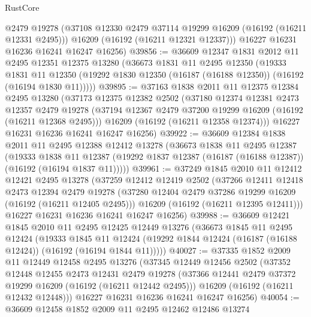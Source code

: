 \begin{lexlean}{RustCore}
\begin{coremodule}
        @2479
        @19278
        (@37108 @12330 @2479 @37114 @19299 @16209 (@16192 (@16211 @12331 @2495)))
        @16209
        (@16192 (@16211 @12321 @12337)))
      @16227
      @16231
      @16236
      @16241
      @16247
      @16256)
@39856 := @36609
    @12347
    @1831
    @2012
    @11
    @2495
    @12351
    @12375
    @13280
    (@36673
      @1831
      @11
      @2495
      @12350
      (@19333
        @1831
        @11
        @12350
        (@19292 @1830 @12350 (@16187 (@16188 @12350)) (@16192 (@16194 @1830 @11)))))
@39895 := @37163
    @1838
    @2011
    @11
    @12375
    @12384
    @2495
    @13280
    (@37173
      @12375
      @12382
      @2502
      (@37180
        @12374
        @12381
        @2473
        @12357
        @2479
        @19278
        (@37194 @12367 @2479 @37200 @19299 @16209 (@16192 (@16211 @12368 @2495)))
        @16209
        (@16192 (@16211 @12358 @12374)))
      @16227
      @16231
      @16236
      @16241
      @16247
      @16256)
@39922 := @36609
    @12384
    @1838
    @2011
    @11
    @2495
    @12388
    @12412
    @13278
    (@36673
      @1838
      @11
      @2495
      @12387
      (@19333
        @1838
        @11
        @12387
        (@19292 @1837 @12387 (@16187 (@16188 @12387)) (@16192 (@16194 @1837 @11)))))
@39961 := @37249
    @1845
    @2010
    @11
    @12412
    @12421
    @2495
    @13278
    (@37259
      @12412
      @12419
      @2502
      (@37266
        @12411
        @12418
        @2473
        @12394
        @2479
        @19278
        (@37280 @12404 @2479 @37286 @19299 @16209 (@16192 (@16211 @12405 @2495)))
        @16209
        (@16192 (@16211 @12395 @12411)))
      @16227
      @16231
      @16236
      @16241
      @16247
      @16256)
@39988 := @36609
    @12421
    @1845
    @2010
    @11
    @2495
    @12425
    @12449
    @13276
    (@36673
      @1845
      @11
      @2495
      @12424
      (@19333
        @1845
        @11
        @12424
        (@19292 @1844 @12424 (@16187 (@16188 @12424)) (@16192 (@16194 @1844 @11)))))
@40027 := @37335
    @1852
    @2009
    @11
    @12449
    @12458
    @2495
    @13276
    (@37345
      @12449
      @12456
      @2502
      (@37352
        @12448
        @12455
        @2473
        @12431
        @2479
        @19278
        (@37366 @12441 @2479 @37372 @19299 @16209 (@16192 (@16211 @12442 @2495)))
        @16209
        (@16192 (@16211 @12432 @12448)))
      @16227
      @16231
      @16236
      @16241
      @16247
      @16256)
@40054 := @36609
    @12458
    @1852
    @2009
    @11
    @2495
    @12462
    @12486
    @13274

\end{coremodule}
\end{lexlean}
